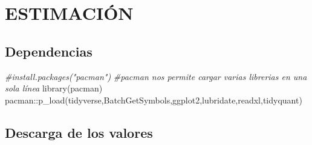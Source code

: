 \documentclass[
]{book}
\newenvironment{Shaded}{\begin{snugshade}}{\end{snugshade}}
\newcommand{\CommentTok}[1]{\textcolor[rgb]{0.56,0.35,0.01}{\textit{#1}}}
\newcommand{\FunctionTok}[1]{\textcolor[rgb]{0.00,0.00,0.00}{#1}}
\newcommand{\NormalTok}[1]{#1}
\newcommand{\SpecialCharTok}[1]{\textcolor[rgb]{0.00,0.00,0.00}{#1}}
\begin{document}
\hypertarget{estimaciuxf3n}{%
\section{ESTIMACIÓN}\label{estimaciuxf3n}}

\hypertarget{dependencias-1}{%
\subsection{Dependencias}\label{dependencias-1}}

\begin{Shaded}
\begin{Highlighting}[]
\CommentTok{\#install.packages("pacman")}
\CommentTok{\#pacman nos permite cargar varias librerias en una sola línea}
\FunctionTok{library}\NormalTok{(pacman)}
\NormalTok{pacman}\SpecialCharTok{::}\FunctionTok{p\_load}\NormalTok{(tidyverse,BatchGetSymbols,ggplot2,lubridate,readxl,tidyquant)}
\end{Highlighting}
\end{Shaded}

\hypertarget{descarga-de-los-valores-1}{%
\subsection{Descarga de los valores}\label{descarga-de-los-valores-1}}
\end{document}

